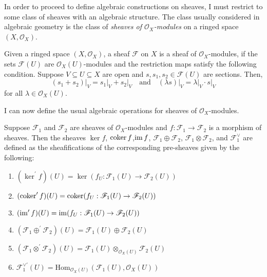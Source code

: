 In order to proceed to define algebraic constructions on sheaves, I must
restrict to some class of sheaves with an algebraic structure. The class
usually considered in algebraic geometry is the class of
\emph{sheaves of $\mathscr{O}_{X}$-modules} on a ringed space
$(X,\mathscr{O}_{X})$.
\begin{defin}
  Given a ringed space $(X,\mathscr{O}_{X})$, a sheaf $\mathscr{F}$ on $X$
  is a sheaf of $\mathscr{O}_{X}$-modules, if the sets $\mathscr{F}(U)$
  are $\mathscr{O}_{X}(U)$-modules and the restriction maps satisfy the
  following condition. Suppose $V\subseteq U\subseteq X$ are open and
  $s,s_{1}, s_{2}\in\mathscr{F}(U)$ are sections. Then,
  \[
    (s_{1}+s_{2})\vert_{V}=s_{1}\vert_{V}+s_{2}\vert_{V}\quad
    \text{and}\quad (\lambda s)\vert_{V}=\lambda\vert_{V}\cdot s\vert_{V}
  \]
  for all $\lambda\in\mathscr{O}_{X}(U)$.
\end{defin}
I can now define the usual algebraic operations for sheaves of
$\mathscr{O}_{X}$-modules.
\begin{defin}\label{def:sheaf_algebra}
  Suppose $\mathscr{F}_{1}$ and $\mathscr{F}_{2}$ are sheaves of
  $\mathscr{O}_{X}$-modules and $f:\mathscr{F}_{1}\to\mathscr{F}_{2}$ is a
  morphism of sheaves. Then the sheaves $\ker f$, $\operatorname{coker} f$,$\operatorname{im} f$,
  $\mathscr{F}_{1}\oplus\mathscr{F}_{2}$, $\mathscr{F}_{1}\otimes
  \mathscr{F}_{2}$, and $\mathscr{F}_{1}^{\vee}$ are defined as the
  sheafifications of the corresponding pre-sheaves given by the following:
  \begin{enumerate}
    \item $(\ker^{\prime} f)(U) = \ker(f_{U}:\mathscr{F}_{1}(U)
          \to\mathscr{F}_{2}(U))$
    \item $(\operatorname{coker}^{\prime} f)(U) = \operatorname{coker}(f_{U}:\mathscr{F}_{1}(U)
          \to\mathscr{F}_{2}(U))$
    \item $(\operatorname{im}^{\prime} f)(U)=\operatorname{im}(f_{U}:\mathscr{F}_{1}(U)
          \to\mathscr{F}_{2}(U))$
    \item $(\mathscr{F}_{1}\oplus^{\prime}\mathscr{F}_{2})(U)=\mathscr{F}_{1}(U)
          \oplus\mathscr{F}_{2}(U)$
    \item $(\mathscr{F}_{1}\otimes^{\prime}\mathscr{F}_{2})(U)
          =\mathscr{F}_{1}(U)\otimes_{\mathscr{O}_{X}(U)}\mathscr{F}_{2}(U)$
    \item $\mathscr{F}_{1}^{\vee\prime}(U)=\text{Hom}_{\mathscr{O}_{X}(U)}(
          \mathscr{F}_{1}(U),\mathscr{O}_{X}(U))$
  \end{enumerate}
\end{defin}
